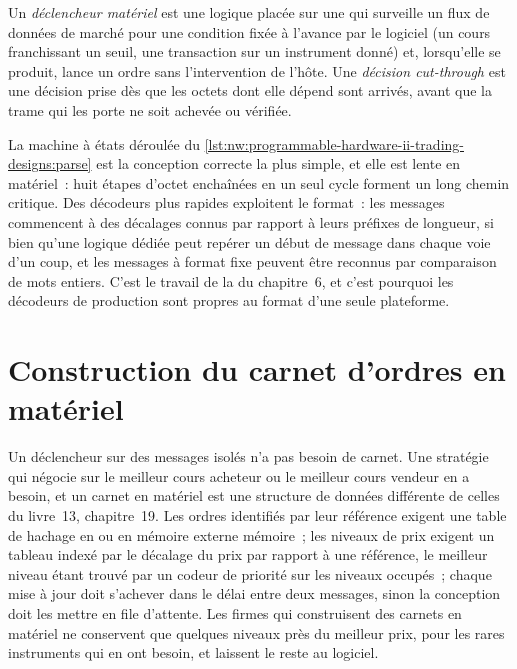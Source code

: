 \label{lst:nw:programmable-hardware-ii-trading-designs:parse}

\begin{definition}\label{def:nw:programmable-hardware-ii-trading-designs:trigger}
Un \emph{déclencheur matériel} est une logique placée sur une  qui surveille un flux de données de marché pour une condition fixée
à l'avance par le logiciel (un cours franchissant un seuil, une transaction sur un instrument donné) et, lorsqu'elle se produit, lance un ordre sans
l'intervention de l'hôte. Une \emph{décision cut-through} est une décision prise dès que les octets dont elle dépend
sont arrivés, avant que la trame qui les porte ne soit achevée ou vérifiée.
\end{definition}

La machine à états déroulée du \cref{lst:nw:programmable-hardware-ii-trading-designs:parse} est la conception correcte la plus simple, et elle est
lente en matériel~: huit étapes d'octet enchaînées en un seul cycle forment un long chemin critique. Des décodeurs plus rapides exploitent le format~: les messages commencent à
des décalages connus par rapport à leurs préfixes de longueur, si bien qu'une logique dédiée peut repérer un début de message dans chaque voie d'un coup, et les messages à format fixe
peuvent être reconnus par comparaison de mots entiers. C'est le travail de la  du chapitre~6, et c'est pourquoi les décodeurs de production sont
propres au format d'une seule plateforme.

\section{Construction du carnet d'ordres en matériel}

Un déclencheur sur des messages isolés n'a pas besoin de carnet. Une stratégie qui négocie sur le meilleur cours acheteur ou le meilleur cours vendeur en a besoin, et un carnet en matériel est une
structure de données différente de celles du livre~13, chapitre~19. Les ordres identifiés par leur référence exigent une table de hachage en  ou en mémoire externe
mémoire~; les niveaux de prix exigent un tableau indexé par le décalage du prix par rapport à une référence, le meilleur niveau étant trouvé par un codeur de priorité sur les
niveaux occupés~; chaque mise à jour doit s'achever dans le délai entre deux messages, sinon la conception doit les mettre en file d'attente. Les firmes qui construisent des carnets
en matériel ne conservent que quelques niveaux près du meilleur prix, pour les rares instruments qui en ont besoin, et laissent le reste au logiciel.

